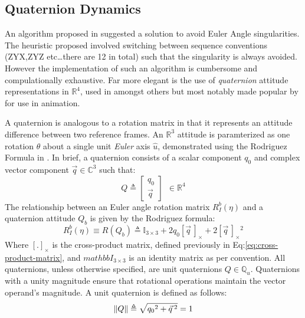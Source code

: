 \subsection{Quaternion Dynamics}
\label{subsec:dynamics.rigidbody.quaternion}
An algorithm proposed in \cite{euleranglesingularity} suggested a solution to avoid Euler Angle singularities. The heuristic proposed involved switching between sequence conventions (ZYX,ZYZ etc\ldots there are 12 in total) such that the singularity is always avoided. However the implementation of such an algorithm is cumbersome and compulationally exhaustive. Far more elegant is the use of \emph{quaternion} attitude representations in $\mathbb{R}^4$, used in \cite{rotationsequences,spacecraftattitutdequaternions} amongst others but most notably made popular by \cite{shoemake} for use in animation.
\par
A quaternion is analogous to a rotation matrix in that it represents an attitude difference between two reference frames. An $\mathbb{R}^3$ attitude is paramterized as one rotation $\theta$ about a single unit \emph{Euler} axis $\hat{u}$, demonstrated using the Rodriguez Formula in \cite{unwinding}. In brief, a quaternion consists of a scalar component $q_0$ and complex vector component $\vec{q}\in \mathbb{C}^3$ such that:
\begin{equation}
Q\triangleq 
\begin{bmatrix}
q_0 \\
\vec{q}
\end{bmatrix}
~~\in\mathbb{R}^4
\end{equation}
The relationship between an Euler angle rotation matrix $R_I^b(\eta)$ and a quaternion attitude $Q_b$ is given by the Rodriguez formula:
\begin{equation}\label{eq:rodriguez}
R_I^b(\eta)\equiv R(Q_b)\triangleq \mathbb{I}_{3\times 3}+2q_0[\vec{q}\hspace{2pt}]_\times+2[\vec{q}\hspace{2pt}]_\times\text{}^2
\end{equation}
Where $[.]_\times$ is the cross-product matrix, defined previously in Eq:\ref{eq:cross-product-matrix}, and $
mathbb{I}_{3\times 3}$ is an identity matrix as per convention. All quaternions, unless otherwise specified, are unit quaternions $Q\in\mathbb{Q}_u$. Quaternions with a unity magnitude ensure that rotational operations maintain the vector operand's magnitude. A unit quaternion is defined as follows:
\begin{equation}
\left\lVert Q\right\rVert\triangleq\sqrt{{q_0}^2+\vec{q}\text{}\hspace{2pt}^2}=1
\end{equation}
